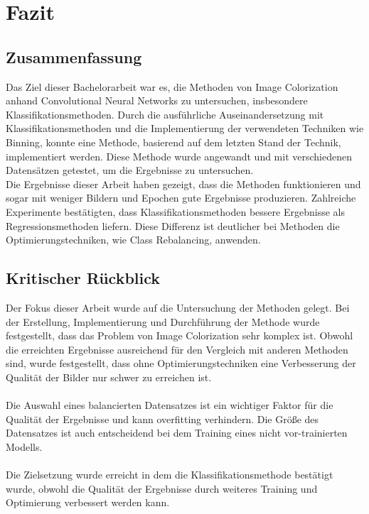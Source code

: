 \chapter{Fazit}

\section{Zusammenfassung}
Das Ziel dieser Bachelorarbeit war es, die Methoden von Image Colorization anhand Convolutional Neural Networks zu untersuchen, insbesondere
Klassifikationsmethoden. Durch die ausführliche Auseinandersetzung mit Klassifikationsmethoden und die Implementierung der verwendeten Techniken
wie Binning, konnte eine Methode, basierend auf dem letzten Stand der Technik, implementiert werden. Diese Methode wurde angewandt und mit verschiedenen
Datensätzen getestet, um die Ergebnisse zu untersuchen.
\\
Die Ergebnisse dieser Arbeit haben gezeigt, dass die Methoden funktionieren und sogar mit weniger Bildern und Epochen gute Ergebnisse produzieren.
Zahlreiche Experimente bestätigten, dass Klassifikationsmethoden bessere Ergebnisse als Regressionsmethoden liefern. Diese Differenz ist deutlicher
bei Methoden die Optimierungstechniken, wie Class Rebalancing, anwenden.


\section{Kritischer Rückblick}
Der Fokus dieser Arbeit wurde auf die Untersuchung der Methoden gelegt. Bei der Erstellung, Implementierung und Durchführung der Methode wurde
festgestellt, dass das Problem von Image Colorization sehr komplex ist. Obwohl die erreichten Ergebnisse ausreichend für den Vergleich mit
anderen Methoden sind, wurde festgestellt, dass ohne Optimierungstechniken eine Verbesserung der Qualität der Bilder nur schwer zu erreichen ist.
\\
\\
Die Auswahl eines balancierten Datensatzes ist ein wichtiger Faktor für die Qualität der Ergebnisse und kann \gls{overfitting} verhindern. Die Größe
des Datensatzes ist auch entscheidend bei dem Training eines nicht vor-trainierten Modells.
\\
\\
Die Zielsetzung wurde erreicht in dem die Klassifikationsmethode bestätigt wurde, obwohl die Qualität der Ergebnisse durch weiteres Training
und Optimierung verbessert werden kann.

